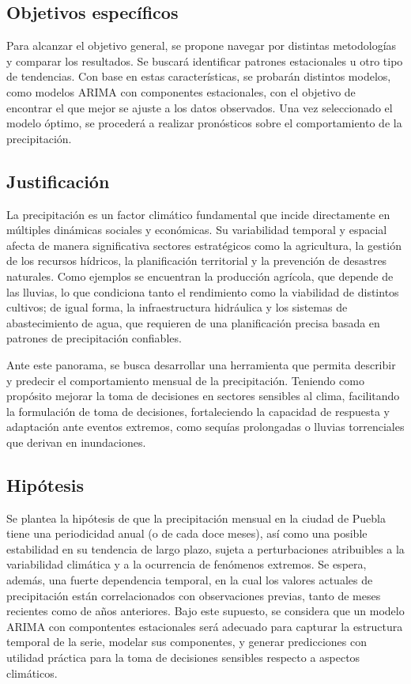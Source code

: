\documentclass[12pt,letterpaper]{article}   %
\begin{document}
\subsection{Objetivos específicos}
Para alcanzar el objetivo general, se propone navegar por distintas metodologías y comparar los resultados. Se buscará identificar patrones estacionales u otro tipo de tendencias. Con base en estas características, se probarán distintos modelos, como modelos ARIMA  con componentes estacionales, con el objetivo de encontrar el que mejor se ajuste a los datos observados. Una vez seleccionado el modelo óptimo, se procederá a realizar pronósticos sobre el comportamiento de la precipitación. 



\subsection{Justificación}
La precipitación es un factor climático fundamental que incide directamente en múltiples dinámicas sociales y económicas. Su variabilidad temporal y espacial afecta de manera significativa sectores estratégicos como la agricultura, la gestión de los recursos hídricos, la planificación territorial y la prevención de desastres naturales. Como ejemplos se encuentran la producción agrícola, que depende de las lluvias, lo que condiciona tanto el rendimiento como la viabilidad de distintos cultivos; de igual forma, la infraestructura hidráulica y los sistemas de abastecimiento de agua, que requieren de una planificación precisa basada en patrones de precipitación confiables.

Ante este panorama, se busca desarrollar una herramienta que permita describir y predecir el comportamiento mensual de la precipitación. Teniendo como propósito mejorar la toma de decisiones en sectores sensibles al clima, facilitando la formulación de toma de decisiones, fortaleciendo la capacidad de respuesta y adaptación ante eventos extremos, como sequías prolongadas o lluvias torrenciales que derivan en inundaciones.


\subsection{Hipótesis}
Se plantea la hipótesis de que la precipitación mensual en la ciudad de Puebla tiene una periodicidad anual (o de cada doce meses), así como una posible estabilidad en su tendencia de largo plazo, sujeta a perturbaciones atribuibles a la variabilidad climática y a la ocurrencia de fenómenos extremos. Se espera, además, una fuerte dependencia temporal, en la cual los valores actuales de precipitación están correlacionados con observaciones previas, tanto de meses recientes como de años anteriores. Bajo este supuesto, se considera que un modelo ARIMA con compontentes estacionales será adecuado para capturar la estructura temporal de la serie, modelar sus componentes, y generar predicciones con utilidad práctica para la toma de decisiones sensibles respecto a aspectos climáticos.
\end{document}
